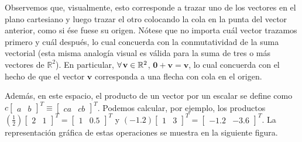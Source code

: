 \documentclass[12pt]{article}
\begin{document}

Observemos que, visualmente, esto corresponde a trazar uno de los vectores en el plano cartesiano y luego trazar el otro colocando la cola en la punta del vector anterior, como si ése fuese su origen. Nótese que no importa cuál vector trazamos primero y cuál después, lo cual concuerda con la conmutatividad de la suma vectorial (esta misma analogía visual es válida para la suma de tres o más vectores de $\mathbb{R}^2$). En particular, $\forall\hspace{0.5mm} \mathbf{v} \in \mathbb{R}^2$, $\mathbf{0}+\mathbf{v}=\mathbf{v}$, lo cual concuerda con el hecho de que el vector $\mathbf{v}$ corresponda a una flecha con cola en el origen.


Además, en este espacio, el producto de un vector por un escalar se define como $c\begin{bmatrix}a&b\end{bmatrix}^T\equiv\begin{bmatrix}ca&cb\end{bmatrix}^T$. Podemos calcular, por ejemplo, los productos $(\frac{1}{2})\begin{bmatrix}2&1\end{bmatrix}^T=\begin{bmatrix}1&0.5\end{bmatrix}^T$ y $(-1.2)\begin{bmatrix}1&3\end{bmatrix}^T=\begin{bmatrix}-1.2&-3.6\end{bmatrix}^T$. La representación gráfica de estas operaciones se muestra en la siguiente figura.

\end{document}
